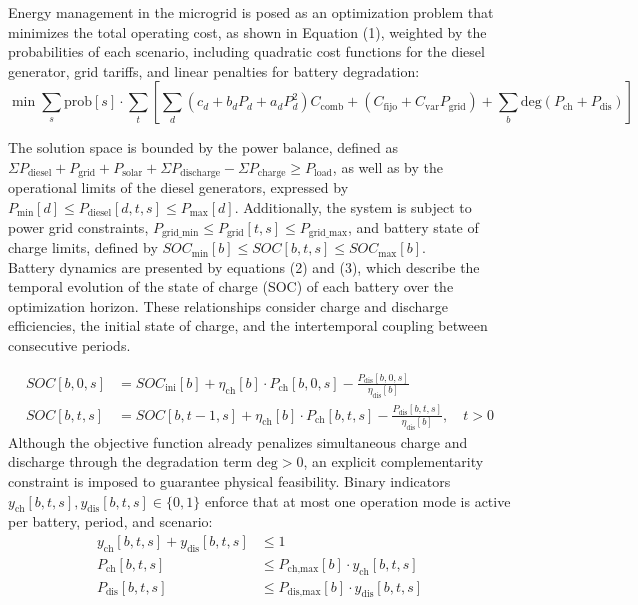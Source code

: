 \documentclass[journal,article,submit,pdftex,moreauthors]{Definitions/mdpi}
\begin{document}
Energy management in the microgrid is posed as an optimization problem that minimizes the total operating cost, as shown in Equation (1), weighted by the probabilities of each scenario, including quadratic cost functions for the diesel generator, grid tariffs, and linear penalties for battery degradation:
\begin{equation}
\min \sum_{s} \text{prob}[s] \cdot \sum_{t} \left[ \sum_{d} (c_d + b_d P_d + a_d P_d^2) C_{\text{comb}} + (C_{\text{fijo}} + C_{\text{var}} P_{\text{grid}}) + \sum_{b} \text{deg} (P_{\text{ch}} + P_{\text{dis}}) \right]
\end{equation}

The solution space is bounded by the power balance, defined as $\Sigma P_{\text{diesel}} + P_{\text{grid}} + P_{\text{solar}} + \Sigma P_{\text{discharge}} - \Sigma P_{\text{charge}} \ge P_{\text{load}}$, as well as by the operational limits of the diesel generators, expressed by $P_{\text{min}}[d] \le P_{\text{diesel}}[d,t,s] \le P_{\text{max}}[d]$. Additionally, the system is subject to power grid constraints, $P_{\text{grid\_min}} \le P_{\text{grid}}[t,s] \le P_{\text{grid\_max}}$, and battery state of charge limits, defined by $SOC_{\text{min}}[b] \le SOC[b,t,s] \le SOC_{\text{max}}[b]$.
\\

Battery dynamics are presented by equations (2) and (3), which describe the temporal evolution of the state of charge (SOC) of each battery over the optimization horizon. These relationships consider charge and discharge efficiencies, the initial state of charge, and the intertemporal coupling between consecutive periods.


    \begin{align}
        SOC[b,0,s] &= SOC_{\text{ini}}[b] + \eta_{\text{ch}}[b] \cdot P_{\text{ch}}[b,0,s] - \frac{P_{\text{dis}}[b,0,s]}{\eta_{\text{dis}}[b]} \\
        SOC[b,t,s] &= SOC[b,t-1,s] + \eta_{\text{ch}}[b] \cdot P_{\text{ch}}[b,t,s] - \frac{P_{\text{dis}}[b,t,s]}{\eta_{\text{dis}}[b]}, \quad t > 0
    \end{align}
Although the objective function already penalizes simultaneous charge and discharge through the degradation term $\text{deg} > 0$, an explicit complementarity constraint is imposed to guarantee physical feasibility. Binary indicators $y_{\text{ch}}[b,t,s], y_{\text{dis}}[b,t,s] \in \{0,1\}$ enforce that at most one operation mode is active per battery, period, and scenario:
    \begin{align}
        y_{\text{ch}}[b,t,s] + y_{\text{dis}}[b,t,s] &\le 1 \\
        P_{\text{ch}}[b,t,s] &\le P_{\text{ch,max}}[b] \cdot y_{\text{ch}}[b,t,s] \\
        P_{\text{dis}}[b,t,s] &\le P_{\text{dis,max}}[b] \cdot y_{\text{dis}}[b,t,s]
    \end{align}
\end{document}
